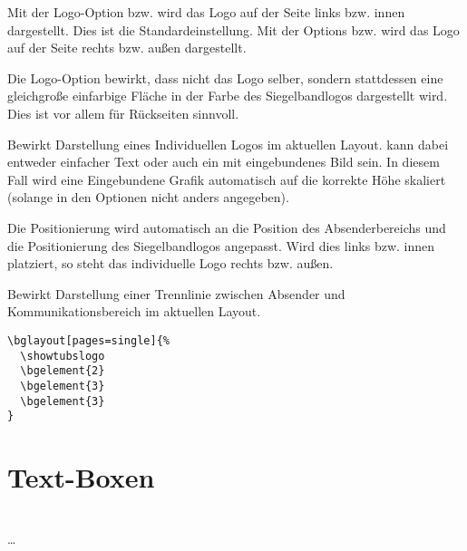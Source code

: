 Mit der Logo-Option  bzw.  wird das Logo auf der Seite
links bzw. innen dargestellt. Dies ist die Standardeinstellung.
Mit der Options  bzw.  wird das Logo auf der
Seite rechts bzw. außen dargestellt.

\begin{Declaration}
\end{Declaration}

Die Logo-Option  bewirkt, dass nicht das Logo selber,
sondern stattdessen eine gleichgroße einfarbige Fläche in der Farbe
des Siegelbandlogos dargestellt wird.
Dies ist vor allem für Rückseiten sinnvoll.


\begin{Declaration}
\end{Declaration}

Bewirkt Darstellung eines Individuellen Logos im aktuellen Layout.
 kann dabei entweder einfacher Text oder auch ein 
mit  eingebundenes Bild sein.
In diesem Fall wird eine Eingebundene Grafik automatisch auf die korrekte
Höhe skaliert (solange in den Optionen nicht anders angegeben).

Die Positionierung wird automatisch an die Position des Absenderbereichs und
die Positionierung des Siegelbandlogos angepasst.
Wird dies links bzw. innen platziert, so steht das individuelle
Logo rechts bzw. außen.

\begin{Declaration}
\end{Declaration}

Bewirkt Darstellung einer Trennlinie zwischen Absender und Kommunikationsbereich
im aktuellen Layout.



\begin{lstlisting}[captionpos=b,caption={Beispiel-Nutzung von bglayout}]
\bglayout[pages=single]{%
  \showtubslogo
  \bgelement{2}
  \bgelement{3}
  \bgelement{3}
}
\end{lstlisting}


\section{Text-Boxen}

\begin{Declaration}
          \\
  \quad\dots\\
\end{Declaration}

